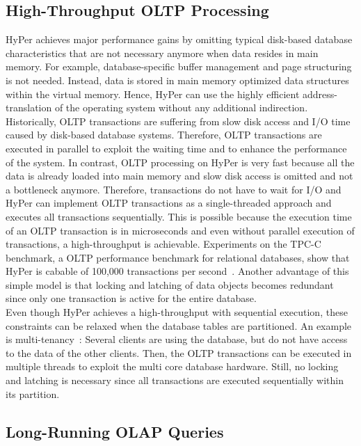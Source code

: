 \subsection{High-Throughput OLTP Processing}
HyPer achieves major performance gains by omitting typical disk-based database characteristics that are not necessary anymore when data resides in main memory. For example, database-specific buffer management and page structuring is not needed. Instead, data is stored in main memory optimized data structures within the virtual memory. Hence, HyPer can use the highly efficient address-translation of the operating system without any additional indirection.
\\
Historically, OLTP transactions are suffering from slow disk access and I/O time caused by disk-based database systems. Therefore, OLTP transactions are executed in parallel to exploit the waiting time and to enhance the performance of the system.
In contrast, OLTP processing on HyPer is very fast because all the data is already loaded into main memory and slow disk access is omitted and not a bottleneck anymore. Therefore, transactions do not have to wait for I/O and HyPer can implement OLTP transactions as a single-threaded approach and executes all transactions sequentially. This is possible because the execution time of an OLTP transaction is in microseconds and even without parallel execution of transactions, a high-throughput is achievable. Experiments on the TPC-C benchmark, a OLTP performance benchmark for relational databases, show that HyPer is cabable of 100,000 transactions per second~\parencite{brawnywimpy}. Another advantage of this simple model is that locking and latching of data objects becomes redundant since only one transaction is active for the entire database. 
\\
Even though HyPer achieves a high-throughput with sequential execution, these constraints can be relaxed when the database tables are partitioned. An example is multi-tenancy~\parencite{mt1}\parencite{mt2}: Several clients are using the database, but do not have access to the data of the other clients. Then, the OLTP transactions can be executed in multiple threads to exploit the multi core database hardware. Still, no locking and latching is necessary since all transactions are executed sequentially within its partition.

\subsection{Long-Running OLAP Queries}

